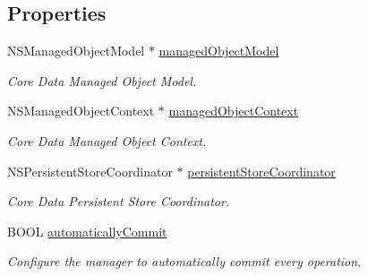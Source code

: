 \subsection*{Properties}
\begin{DoxyCompactItemize}
\item 
\hypertarget{interface_j_p_d_b_manager_a1325c5adbfd7d1952cdf0352fb064ba0}{
NSManagedObjectModel $\ast$ \hyperlink{interface_j_p_d_b_manager_a1325c5adbfd7d1952cdf0352fb064ba0}{managedObjectModel}}
\label{interface_j_p_d_b_manager_a1325c5adbfd7d1952cdf0352fb064ba0}

\begin{DoxyCompactList}\small\item\em Core Data Managed Object Model. \item\end{DoxyCompactList}\item 
\hypertarget{interface_j_p_d_b_manager_a29cf121d302956111efcc92ef6ebeb46}{
NSManagedObjectContext $\ast$ \hyperlink{interface_j_p_d_b_manager_a29cf121d302956111efcc92ef6ebeb46}{managedObjectContext}}
\label{interface_j_p_d_b_manager_a29cf121d302956111efcc92ef6ebeb46}

\begin{DoxyCompactList}\small\item\em Core Data Managed Object Context. \item\end{DoxyCompactList}\item 
\hypertarget{interface_j_p_d_b_manager_ac208712a609c528d79e7073211e4e658}{
NSPersistentStoreCoordinator $\ast$ \hyperlink{interface_j_p_d_b_manager_ac208712a609c528d79e7073211e4e658}{persistentStoreCoordinator}}
\label{interface_j_p_d_b_manager_ac208712a609c528d79e7073211e4e658}

\begin{DoxyCompactList}\small\item\em Core Data Persistent Store Coordinator. \item\end{DoxyCompactList}\item 
BOOL \hyperlink{interface_j_p_d_b_manager_a572163d38a033f106375cabe7b7748fa}{automaticallyCommit}
\begin{DoxyCompactList}\small\item\em Configure the manager to automatically commit every operation. \item\end{DoxyCompactList}\end{DoxyCompactItemize}
